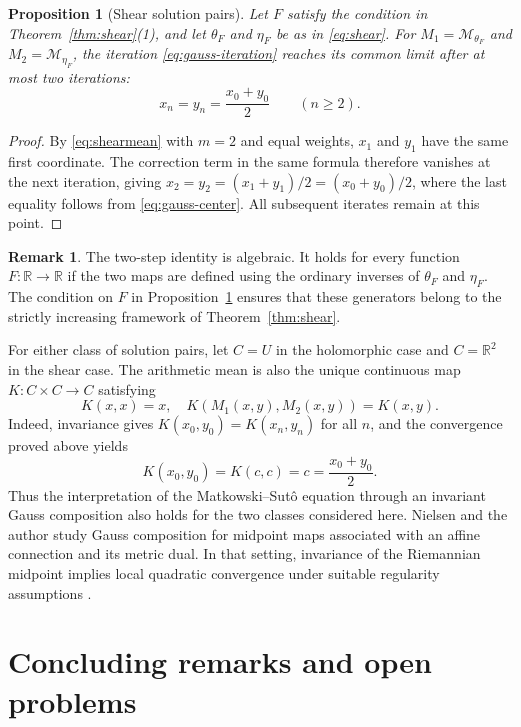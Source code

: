 \documentclass[a4paper, reqno, 11pt]{amsart}
\newtheorem{Prop}[Thm]{Proposition}
\theoremstyle{definition}
\newtheorem{Rem}[Thm]{Remark}
\begin{document}
\begin{Prop}[Shear solution pairs]\label{prop:gauss-shear}
Let $F$ satisfy the condition in Theorem~\ref{thm:shear}(1),
and let $\theta_F$ and $\eta_F$ be as in \eqref{eq:shear}.
For $M_1 = \mathcal M_{\theta_F}$ and $M_2 = \mathcal M_{\eta_F}$,
the iteration \eqref{eq:gauss-iteration} reaches its common limit after
at most two iterations:
\begin{equation*}
  x_n = y_n = \frac{x_0+y_0}{2}\qquad(n\geq2).
\end{equation*}
\end{Prop}



\begin{proof}
By \eqref{eq:shearmean} with $m=2$ and equal weights,
$x_1$ and $y_1$ have the same first coordinate.
The correction term in the same formula therefore vanishes at the next
iteration, giving $x_2 = y_2 = (x_1+y_1)/2 = (x_0+y_0)/2$, 
where the last equality follows from \eqref{eq:gauss-center}.
All subsequent iterates remain at this point.
\end{proof}

\begin{Rem}\label{rem:gauss-arbitrary-shear}
The two-step identity is algebraic. 
It holds for every function $F \colon \mathbb R\to\mathbb R$ if the two maps are defined using the ordinary inverses of $\theta_F$ and $\eta_F$. 
The condition on $F$ in Proposition~\ref{prop:gauss-shear} ensures that these generators belong to the strictly increasing framework of Theorem~\ref{thm:shear}.
\end{Rem}

For either class of solution pairs, let $C=U$ in the holomorphic case and $C=\mathbb R^2$ in the shear case. 
The arithmetic mean is also the unique continuous map $K:C\times C\to C$ satisfying
\[ K(x,x)=x,\quad K(M_1(x,y),M_2(x,y))=K(x,y).\]
Indeed, invariance gives $K(x_0,y_0)=K(x_n,y_n)$ for all $n$, and
the convergence proved above yields
\[  K(x_0,y_0)=K(c,c)=c=\frac{x_0+y_0}{2}.\]
Thus the interpretation of the Matkowski--Sut\^o equation through an invariant Gauss composition also holds for the two classes considered here. 
Nielsen and the author study Gauss composition for midpoint maps associated with an affine connection and its metric dual.
In that setting, invariance of the Riemannian midpoint implies local quadratic convergence under suitable regularity assumptions \cite[Theorem~3.2]{NielsenOkamura}.

\section{Concluding remarks and open problems}\label{sec:conclusion}
\end{document}
